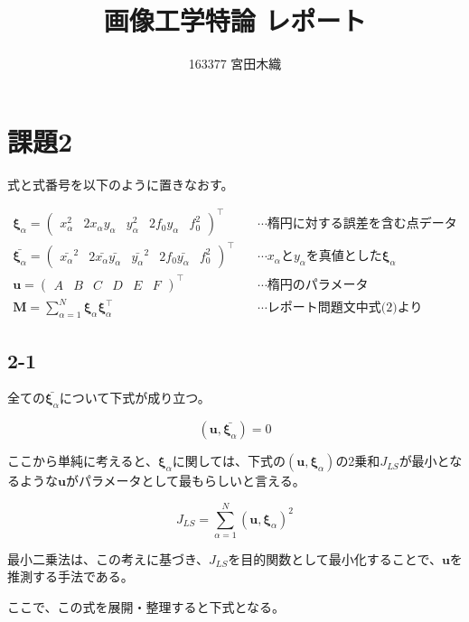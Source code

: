 \documentclass[12pt,a4j]{jsarticle}
\title{画像工学特論 レポート}
\author{163377 宮田木織}
\newcommand{\xa}{x_\alpha}
\newcommand{\ya}{y_\alpha}
\newcommand{\xia}{\bm{\xi}_\alpha}
\begin{document}
  \maketitle %

\section*{課題2}
  式と式番号を以下のように置きなおす。

  \begin{align}
    \xia = \begin{pmatrix}\xa^2 & 2\xa\ya & \ya^2 & 2f_0\ya & f_0^2\end{pmatrix}^\top
     & \quad\cdots\text{楕円に対する誤差を含む点データ} \\
    \bar{\xia} = \begin{pmatrix}\bar{\xa}^2 & 2\bar{\xa}\bar{\ya} & \bar{\ya}^2 & 2f_0\bar{\ya} & f_0^2\end{pmatrix}^\top
     & \quad\cdots\text{$\xa$と$\ya$を真値とした$\xia$} \\
    \bm{u} = \begin{pmatrix}A & B & C & D & E & F\end{pmatrix}^\top
     & \quad\cdots\text{楕円のパラメータ} \\
    \bm{M} = \sum_{\alpha = 1}^N \xia \xia^\top
     & \quad\cdots\text{レポート問題文中式(2)より} \label{eq:M}
  \end{align}

  \subsection*{2-1}

  全ての$\bar{\xia}$について下式が成り立つ。

  \begin{equation}
    (\bm{u}, \bar{\xia}) = 0
  \end{equation}

  ここから単純に考えると、$\xia$に関しては、下式の$(\bm{u}, \xia)$の2乗和$J_{LS}$が最小となるような$\bm{u}$がパラメータとして最もらしいと言える。

  \begin{equation}
    J_{LS} = \sum_{\alpha = 1}^N (\bm{u}, \xia)^2
  \end{equation}

  最小二乗法は、この考えに基づき、$J_{LS}$を目的関数として最小化することで、$\bm{u}$を推測する手法である。\par
  ここで、この式を展開・整理すると下式となる。
\end{document}
